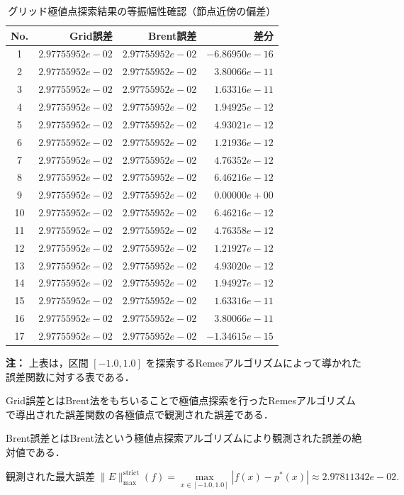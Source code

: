 \begin{table}[H]
 \centering
 \caption{グリッド極値点探索結果の等振幅性確認（節点近傍の偏差）}
 \label{tab:remes-grid-final-check}
 \begin{tabular}{crrr}
 \toprule
 No. & Grid誤差 & Brent誤差 & 差分 \\
 \midrule
 1 & $2.97755952e-02$ & $2.97755952e-02$ & $-6.86950e-16$ \\
 2 & $2.97755952e-02$ & $2.97755952e-02$ & $3.80066e-11$ \\
 3 & $2.97755952e-02$ & $2.97755952e-02$ & $1.63316e-11$ \\
 4 & $2.97755952e-02$ & $2.97755952e-02$ & $1.94925e-12$ \\
 5 & $2.97755952e-02$ & $2.97755952e-02$ & $4.93021e-12$ \\
 6 & $2.97755952e-02$ & $2.97755952e-02$ & $1.21936e-12$ \\
 7 & $2.97755952e-02$ & $2.97755952e-02$ & $4.76352e-12$ \\
 8 & $2.97755952e-02$ & $2.97755952e-02$ & $6.46216e-12$ \\
 9 & $2.97755952e-02$ & $2.97755952e-02$ & $0.00000e+00$ \\
 10 & $2.97755952e-02$ & $2.97755952e-02$ & $6.46216e-12$ \\
 11 & $2.97755952e-02$ & $2.97755952e-02$ & $4.76358e-12$ \\
 12 & $2.97755952e-02$ & $2.97755952e-02$ & $1.21927e-12$ \\
 13 & $2.97755952e-02$ & $2.97755952e-02$ & $4.93020e-12$ \\
 14 & $2.97755952e-02$ & $2.97755952e-02$ & $1.94927e-12$ \\
 15 & $2.97755952e-02$ & $2.97755952e-02$ & $1.63316e-11$ \\
 16 & $2.97755952e-02$ & $2.97755952e-02$ & $3.80066e-11$ \\
 17 & $2.97755952e-02$ & $2.97755952e-02$ & $-1.34615e-15$ \\
 \bottomrule
 \end{tabular}
\vspace{1mm}

\small \textbf{注：}
\small 上表は，区間 $[-1.0,1.0]$ を探索するRemesアルゴリズムによって導かれた誤差関数に対する表である．

\small Grid誤差とはBrent法をもちいることで極値点探索を行ったRemesアルゴリズムで導出された誤差関数の各極値点で観測された誤差である．

\small Brent誤差とはBrent法という極値点探索アルゴリズムにより観測された誤差の絶対値である．

\[
 \text{観測された最大誤差} \; \|E\|_{\max}^{\text{strict}}(f) = \max_{x \in [-1.0,1.0]} |f(x) - p^*(x)| \approx 2.97811342e-02 .
 \]
\end{table}
